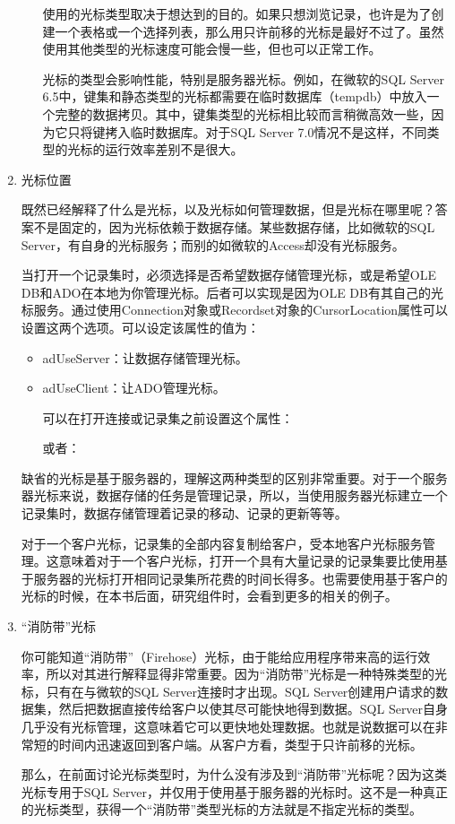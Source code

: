 \begin{enumerate}
\begin{itemize}
使用的光标类型取决于想达到的目的。如果只想浏览记录，也许是为了创建一个表格或一个选择列表，那么用只许前移的光标是最好不过了。虽然使用其他类型的光标速度可能会慢一些，但也可以正常工作。

光标的类型会影响性能，特别是服务器光标。例如，在微软的SQL Server 6.5中，键集和静态类型的光标都需要在临时数据库（tempdb）中放入一个完整的数据拷贝。其中，键集类型的光标相比较而言稍微高效一些，因为它只将键拷入临时数据库。对于SQL Server 7.0情况不是这样，不同类型的光标的运行效率差别不是很大。
\end{itemize}
	\item  光标位置

既然已经解释了什么是光标，以及光标如何管理数据，但是光标在哪里呢？答案不是固定的，因为光标依赖于数据存储。某些数据存储，比如微软的SQL Server，有自身的光标服务；而别的如微软的Access却没有光标服务。

当打开一个记录集时，必须选择是否希望数据存储管理光标，或是希望OLE DB和ADO在本地为你管理光标。后者可以实现是因为OLE DB有其自己的光标服务。通过使用Connection对象或Recordset对象的CursorLocation属性可以设置这两个选项。可以设定该属性的值为：
\begin{itemize}
\item adUseServer：让数据存储管理光标。

\item adUseClient：让ADO管理光标。

可以在打开连接或记录集之前设置这个属性：



或者：


\end{itemize}
缺省的光标是基于服务器的，理解这两种类型的区别非常重要。对于一个服务器光标来说，数据存储的任务是管理记录，所以，当使用服务器光标建立一个记录集时，数据存储管理着记录的移动、记录的更新等等。

对于一个客户光标，记录集的全部内容复制给客户，受本地客户光标服务管理。这意味着对于一个客户光标，打开一个具有大量记录的记录集要比使用基于服务器的光标打开相同记录集所花费的时间长得多。也需要使用基于客户的光标的时候，在本书后面，研究组件时，会看到更多的相关的例子。

	\item ``消防带''光标

你可能知道``消防带''（Firehose）光标，由于能给应用程序带来高的运行效率，所以对其进行解释显得非常重要。因为``消防带''光标是一种特殊类型的光标，只有在与微软的SQL Server连接时才出现。SQL Server创建用户请求的数据集，然后把数据直接传给客户以使其尽可能快地得到数据。SQL Server自身几乎没有光标管理，这意味着它可以更快地处理数据。也就是说数据可以在非常短的时间内迅速返回到客户端。从客户方看，类型于只许前移的光标。

那么，在前面讨论光标类型时，为什么没有涉及到``消防带''光标呢？因为这类光标专用于SQL Server，并仅用于使用基于服务器的光标时。这不是一种真正的光标类型，获得一个``消防带''类型光标的方法就是不指定光标的类型。
\end{enumerate}


